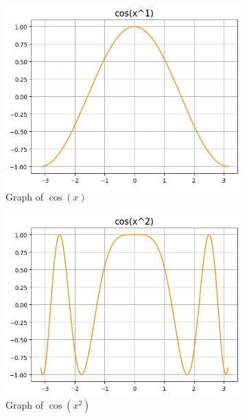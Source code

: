 \documentclass{article}
\begin{document}
\begin{figure}[h!]
        \newline
        \begin{subfigure}[t]{0.3\textwidth}
            \includegraphics[width=\textwidth]{params/cos-x1.png}
            \caption{Graph of $\cos(x)$}
            \label{fig:cos-x1}
        \end{subfigure}
        \hfill
        \begin{subfigure}[t]{0.3\textwidth}
            \includegraphics[width=\textwidth]{params/cos-x2.png}
            \caption{Graph of $\cos(x^2)$}
            \label{fig:cos-x2}
        \end{subfigure}       
        \hfill
        \begin{subfigure}[t]{0.3\textwidth}

\end{subfigure}
\end{figure}
\end{document}
